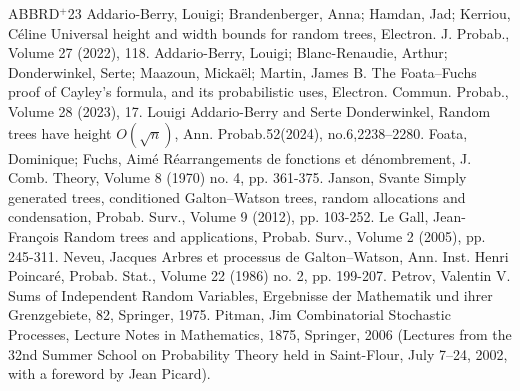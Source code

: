 \documentclass[10pt]{amsart}
\theoremstyle{definition}
\numberwithin{figure}{section}
\begin{document}
\begin{thebibliography}{ABBRD$^{+}$23}
 Addario-Berry, Louigi; Brandenberger, Anna; Hamdan, Jad; Kerriou, Céline Universal height and width bounds for random trees, Electron. J. Probab., Volume 27 (2022), 118.
 Addario-Berry, Louigi; Blanc-Renaudie, Arthur; Donderwinkel, Serte; Maazoun, Mickaël; Martin, James B. The Foata–Fuchs proof of Cayley’s formula, and its probabilistic uses, Electron. Commun. Probab., Volume 28 (2023), 17.
 Louigi Addario-Berry and Serte Donderwinkel, Random trees have height $O(\sqrt{n})$, Ann. Probab.52(2024), no.6,2238–2280.
 Foata, Dominique; Fuchs, Aimé Réarrangements de fonctions et dénombrement, J. Comb. Theory, Volume 8 (1970) no. 4, pp. 361-375.
 Janson, Svante Simply generated trees, conditioned Galton–Watson trees, random allocations and condensation, Probab. Surv., Volume 9 (2012), pp. 103-252.
 Le Gall, Jean-François Random trees and applications, Probab. Surv., Volume 2 (2005), pp. 245-311.
 Neveu, Jacques Arbres et processus de Galton–Watson, Ann. Inst. Henri Poincaré, Probab. Stat., Volume 22 (1986) no. 2, pp. 199-207.
 Petrov, Valentin V. Sums of Independent Random Variables, Ergebnisse der Mathematik und ihrer Grenzgebiete, 82, Springer, 1975.
 Pitman, Jim Combinatorial Stochastic Processes, Lecture Notes in Mathematics, 1875, Springer, 2006 (Lectures from the 32nd Summer School on Probability Theory held in Saint-Flour, July 7–24, 2002, with a foreword by Jean Picard).
\end{thebibliography}
\end{document}
